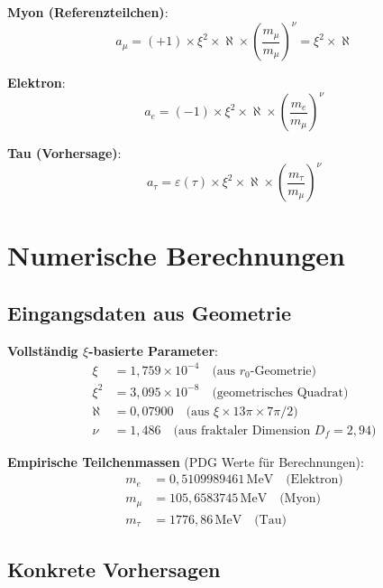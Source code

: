 \documentclass[12pt,a4paper]{article}
\newcommand{\xipar}{\xi}
\newcommand{\rzero}{r_0}
\newcommand{\nulep}{\nu}
\newcommand{\epsilonlep}{\varepsilon}
\begin{document}
	\textbf{Myon (Referenzteilchen)}:
	\begin{equation}
		a_\mu = (+1) \times \xipar^2 \times \aleph \times \left(\frac{m_\mu}{m_\mu}\right)^\nulep = \xipar^2 \times \aleph
	\end{equation}
	
	\textbf{Elektron}:
	\begin{equation}
		a_e = (-1) \times \xipar^2 \times \aleph \times \left(\frac{m_e}{m_\mu}\right)^\nulep
	\end{equation}
	
	\textbf{Tau (Vorhersage)}:
	\begin{equation}
		a_\tau = \epsilonlep(\tau) \times \xipar^2 \times \aleph \times \left(\frac{m_\tau}{m_\mu}\right)^\nulep
	\end{equation}
	
	\section{Numerische Berechnungen}
	
	\subsection{Eingangsdaten aus Geometrie}
	
	\textbf{Vollst\"andig $\xipar$-basierte Parameter}:
	\begin{align}
		\xipar &= 1{,}759 \times 10^{-4} \quad \text{(aus $\rzero$-Geometrie)} \\
		\xipar^2 &= 3{,}095 \times 10^{-8} \quad \text{(geometrisches Quadrat)} \\
		\aleph &= 0{,}07900 \quad \text{(aus $\xipar \times 13\pi \times 7\pi/2$)} \\
		\nulep &= 1{,}486 \quad \text{(aus fraktaler Dimension $D_f = 2{,}94$)}
	\end{align}
	
	\textbf{Empirische Teilchenmassen} (PDG Werte f\"ur Berechnungen):
	\begin{align}
		m_e &= 0{,}5109989461\,\text{MeV} \quad \text{(Elektron)} \\
		m_\mu &= 105{,}6583745\,\text{MeV} \quad \text{(Myon)} \\
		m_\tau &= 1776{,}86\,\text{MeV} \quad \text{(Tau)}
	\end{align}
	
	\subsection{Konkrete Vorhersagen}
	
\end{document}
